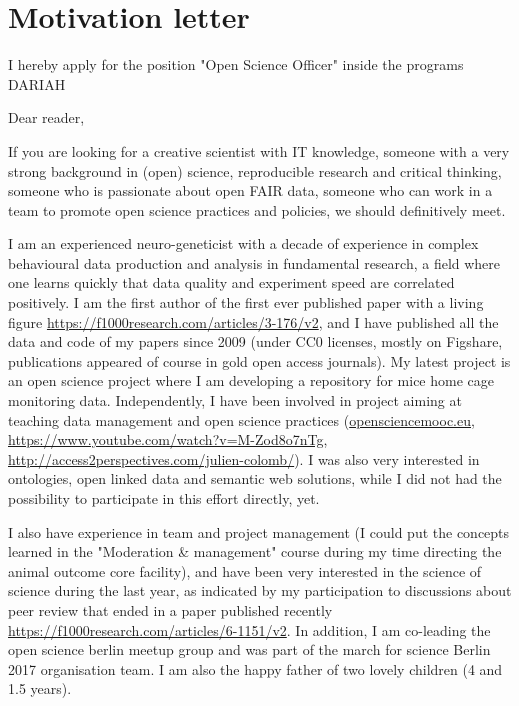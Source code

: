 \section* {Motivation letter}

I hereby apply for the position "Open Science Officer" inside the programs DARIAH
\vspace {0.5cm} 

Dear reader,

If you are looking for a creative scientist with IT knowledge, someone with a very strong background in (open) science, reproducible research and critical thinking, someone who is passionate about open FAIR data, someone who can work in a team to promote open science practices and policies, we should definitively meet.

I am an experienced neuro-geneticist with a decade of experience in complex behavioural data production and analysis in fundamental research, a field where one learns quickly that data quality and experiment speed are correlated positively. I am the first author of the first ever published paper with a living figure \url{https://f1000research.com/articles/3-176/v2}, and I have published all the data and code of my papers since 2009 (under CC0 licenses, mostly on Figshare, publications appeared of course in gold open access journals). My latest project is an open science project where I am developing a repository for mice home cage monitoring data. Independently, I have been involved in project aiming at teaching data management and open science practices (\url{opensciencemooc.eu}, \url{https://www.youtube.com/watch?v=M-Zod8o7nTg}, \url{http://access2perspectives.com/julien-colomb/}). I was also very interested in ontologies, open linked data and semantic web solutions, while I did not had the possibility to participate in this effort directly, yet.

I also have experience in team and project management (I could put the concepts learned in the "Moderation \& management" course during my time directing the animal outcome core facility), and have been very interested in the science of science during the last year, as indicated by my participation to discussions about peer review that ended in a paper published recently \url{https://f1000research.com/articles/6-1151/v2}. 
In addition, I am co-leading the open science berlin meetup group and was part of the march for science Berlin 2017 organisation team. I am also the happy father of two lovely children (4 and 1.5 years).

